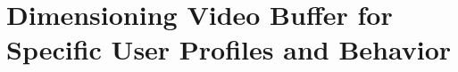 \section{Dimensioning Video Buffer for Specific User Profiles and Behavior}\label{application:qoe_user_behaviour}

\newcommand{\stallingRatio}{\ensuremath{R}\xspace}
\newcommand{\numberStallingEvents}{\ensuremath{N^*}\xspace}
\newcommand{\stallingFrequency}{\ensuremath{F}\xspace}
\newcommand{\meanStallingEventDuration}{\ensuremath{L}\xspace}

\newcommand{\networkBandwidth}{\ensuremath{\lambda}\xspace}
\newcommand{\playbackRate}{\ensuremath{\mu}\xspace}

\newcommand{\meanBusy}{\ensuremath{B}\xspace}
\newcommand{\meanIdle}{\ensuremath{L}\xspace}
\newcommand{\numberFrames}{\ensuremath{Z}\xspace}
\newcommand{\videoDownloadTime}{\ensuremath{t_Z}\xspace}



